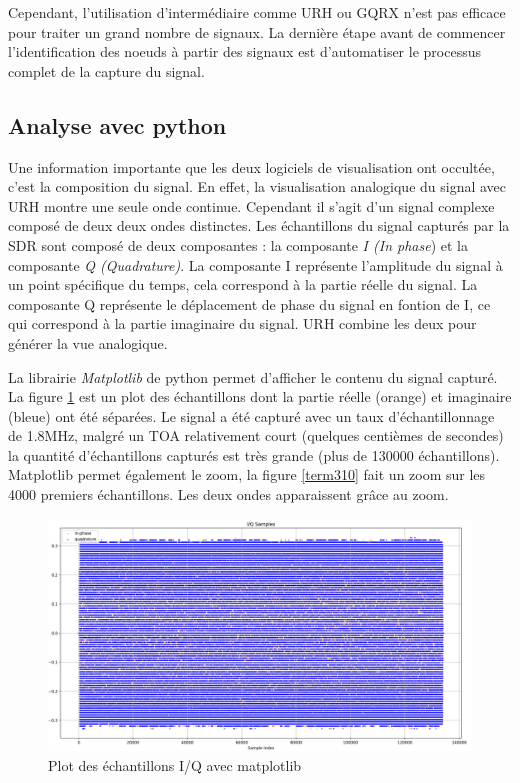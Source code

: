 Cependant, l'utilisation d'intermédiaire comme URH ou GQRX n'est pas efficace pour traiter un grand nombre de signaux. La dernière étape avant de commencer l'identification des noeuds à partir des signaux est d'automatiser le processus complet de la capture du signal.

\subsection{Analyse avec python}

Une information importante que les deux logiciels de visualisation ont occultée, c'est la composition du signal. En effet, la visualisation analogique du signal avec URH montre une seule onde continue. Cependant il s'agit d'un signal complexe composé de deux deux ondes distinctes. Les échantillons du signal capturés par la SDR sont composé de deux composantes : la composante \textit{I (In phase}) et la composante \textit{Q (Quadrature)}. La composante I représente l'amplitude du signal à un point spécifique du temps, cela correspond à la partie réelle du signal. La composante Q représente le déplacement de phase du signal en fontion de I, ce qui correspond à la partie imaginaire du signal. URH combine les deux pour générer la vue analogique.

La librairie \textit{Matplotlib} de python permet d'afficher le contenu du signal capturé. La figure  \ref{term309} est un plot des échantillons dont la partie réelle (orange) et imaginaire (bleue) ont été séparées. Le signal a été capturé avec un taux d'échantillonnage de 1.8MHz, malgré un TOA relativement court (quelques centièmes de secondes) la quantité d'échantillons capturés est très grande (plus de 130000 échantillons). Matplotlib permet également le zoom, la figure \ref{term310} fait un zoom sur les 4000 premiers échantillons. Les deux ondes apparaissent grâce au zoom.

\begin{figure}[h]
\centering

\includegraphics[scale=0.13]{images/iq1.png}
\caption{Plot des échantillons I/Q avec matplotlib}\label{term309}
\end{figure}

